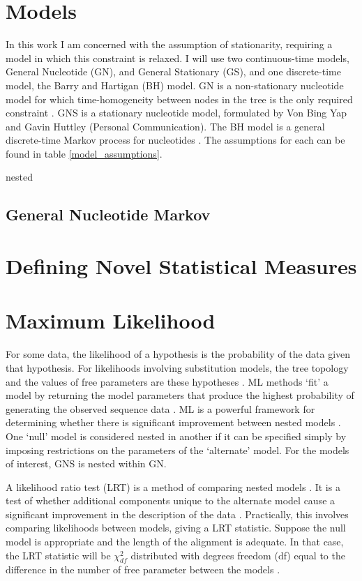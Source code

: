 \section{Models}
In this work I am concerned with the assumption of stationarity, requiring a model in which this constraint is relaxed. I will use two continuous-time models, General Nucleotide (GN), and General Stationary (GS), and one discrete-time model, the Barry and Hartigan (BH) model. GN is a non-stationary nucleotide model for which time-homogeneity between nodes in the tree is the only required constraint \citep{Kaehler2015}. GNS is a stationary nucleotide model, formulated by Von Bing Yap and Gavin Huttley (Personal Communication). The BH model is a general discrete-time Markov process for nucleotides \citep{Barry1987StatisticalEvolution}. The assumptions for each can be found in table \ref{model_assumptions}.


\gls{nested}

\subsection{General Nucleotide Markov}

\section{Defining Novel Statistical Measures}

\section{Maximum Likelihood}

For some data, the likelihood of a hypothesis is the probability of the data given that hypothesis. For likelihoods involving substitution models, the tree topology and the values of free parameters are these hypotheses \cite{Lio1998ModelsPhylogeny}. ML methods `fit' a model by returning the model parameters that produce the highest probability of generating the observed sequence data \citep{Edwards1972Likelihood, Felsenstein1981EvolutionaryApproach}. ML is a powerful framework for determining whether there is significant improvement between nested models \cite{Goldman1993StatisticalSubstitution}. One `null' model is considered nested in another if it can be specified simply by imposing restrictions on the parameters of the `alternate' model. For the models of interest, GNS is nested within GN.

A likelihood ratio test (LRT) is a method of comparing nested models \citep{Goldman1993StatisticalSubstitution}. It is a test of whether additional components unique to the alternate model cause a significant improvement in the description of the data \cite{Goldman1993StatisticalSubstitution}. Practically, this involves comparing likelihoods between models, giving a LRT statistic. Suppose the null model is appropriate and the length of the alignment is adequate. In that case, the LRT statistic will be $\chi^2_{df}$ distributed with degrees freedom (df) equal to the difference in the number of free parameter between the models \citep{Lindgren1976StatisticalTheory, Silvey1975StatisticalInference, Kendall1979The2}.

